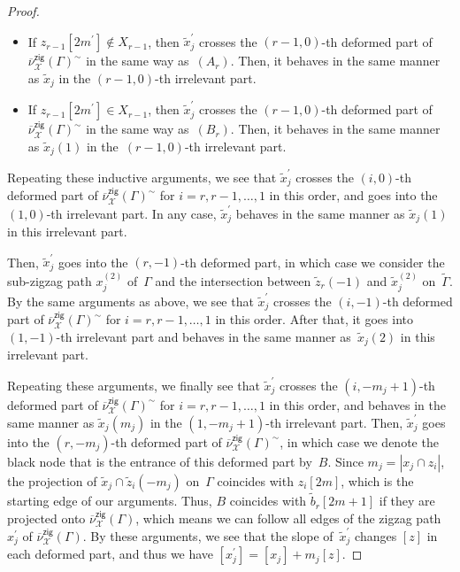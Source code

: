 \documentclass[11pt]{article}
\numberwithin{equation}{section}
\numberwithin{equation}{section}
\numberwithin{figure}{section}
\numberwithin{table}{section}
\newcommand{\calX}{\mathcal{X}}
\newcommand{\zig}{\mathsf{zig}}
\begin{document}
\begin{proof}
\begin{itemize}
\begin{itemize}
\item If $z_{r-1}[2m^\prime]\not\in X_{r-1}$, then $\widetilde{x}_j^\prime$ crosses the $(r-1,0)$-th deformed part of $\overline{\nu}_\calX^\zig(\Gamma)^\sim$ in the same way as~$(A_r)$.
Then, it behaves in the same manner as $\widetilde{x}_j$ in the $(r-1,0)$-th irrelevant part.
\item If $z_{r-1}[2m^\prime]\in X_{r-1}$, then $\widetilde{x}_j^\prime$ crosses the $(r-1,0)$-th deformed part of $\overline{\nu}_\calX^\zig(\Gamma)^\sim$ in the same way as~$(B_r)$.
Then, it behaves in the same manner as $\widetilde{x}_j(1)$ in the~$(r-1,0)$-th irrelevant part.
\end{itemize}
\end{itemize}
Repeating these inductive arguments, we see that $\widetilde{x}^\prime_j$ crosses the $(i,0)$-th deformed part of $\overline{\nu}_\calX^\zig(\Gamma)^\sim$ for $i=r,r-1,\dots,1$ in this order, and goes into the $(1,0)$-th irrelevant part.
In any case, $\widetilde{x}^\prime_j$ behaves in the same manner as $\widetilde{x}_j(1)$ in this irrelevant part.

Then, $\widetilde{x}^\prime_j$ goes into the $(r,-1)$-th deformed part, in which case we consider the sub-zigzag path $x_j^{(2)}$ of~$\Gamma$
and the intersection between $\widetilde{z}_r(-1)$ and $\widetilde{x}_j^{(2)}$ on~$\widetilde{\Gamma}$.
By the same arguments as above, we see that $\widetilde{x}^\prime_j$ crosses the $(i,-1)$-th deformed part of $\overline{\nu}_\calX^\zig(\Gamma)^\sim$ for $i=r,r-1,\dots,1$ in this order.
After that, it goes into $(1,-1)$-th irrelevant part and behaves in the same manner as~$\widetilde{x}_j(2)$ in this irrelevant part.

Repeating these arguments, we finally see that $\widetilde{x}^\prime_j$ crosses the $(i,-m_j+1)$-th deformed part of $\overline{\nu}_\calX^\zig(\Gamma)^\sim$ for $i=r,r-1,\dots,1$ in this order,
and behaves in the same manner as $\widetilde{x}_j(m_j)$ in the $(1,-m_j+1)$-th irrelevant part.
Then, $\widetilde{x}^\prime_j$ goes into the $(r,-m_j)$-th deformed part of $\overline{\nu}_\calX^\zig(\Gamma)^\sim$, in which case
we denote the black node that is the entrance of this deformed part by~$B$.
Since $m_j=|x_j\cap z_i|$, the projection of $\widetilde{x}_j\cap \widetilde{z}_i(-m_j)$ on~$\Gamma$ coincides with $z_i[2m]$, which is the starting edge of our arguments.
Thus, $B$ coincides with $\widetilde{b}_r[2m+1]$ if they are projected onto $\overline{\nu}_\calX^\zig(\Gamma)$,
which means we can follow all edges of the zigzag path $x^\prime_j$ of $\overline{\nu}_\calX^\zig(\Gamma)$.
By these arguments, we see that the slope of~$\widetilde{x}^\prime_j$ changes $[z]$ in each deformed part, and thus we have $[x^{\prime}_j]=[x_j]+m_j[z]$.


\end{proof}
\end{document}
